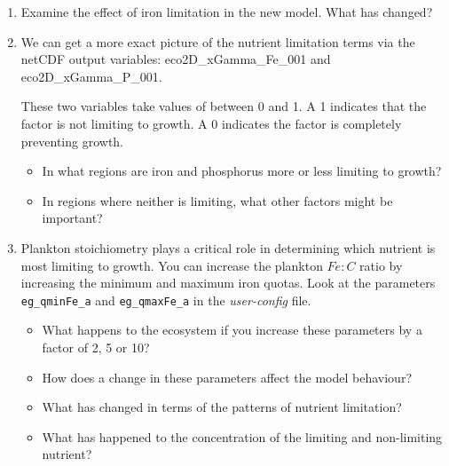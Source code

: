 \documentclass[11pt,fleqn]{book} %
\begin{document}
\begin{enumerate}[noitemsep]
\vspace{1mm}
\item Examine the effect of iron limitation in the new model. What has changed?

\vspace{1mm}
\item We can get a more exact picture of the nutrient limitation terms via the netCDF output variables: \textsf{\footnotesize eco2D\_xGamma\_Fe\_001} and \textsf{\footnotesize eco2D\_xGamma\_P\_001}.

These two variables take values of between 0 and 1. A \textsf{\footnotesize 1} indicates that the factor is not limiting to growth. A \textsf{\footnotesize 0} indicates the factor is completely preventing growth. 
\vspace{1mm}
\begin{itemize}
\item In what regions are iron and phosphorus more or less limiting to growth? \item In regions where neither is limiting, what other factors might be important?
\end{itemize}
\vspace{1mm}

\vspace{1mm}
\item  Plankton stoichiometry plays a critical role in determining which nutrient is most limiting to growth. You can increase the plankton \(Fe:C\) ratio by increasing the minimum and maximum iron quotas. Look at the parameters \texttt{eg\_qminFe\_a} and \texttt{eg\_qmaxFe\_a} in the \textit{user-config} file.

\pagebreak
\begin{itemize}
\item What happens to the ecosystem if you increase these parameters by a factor of 2, 5 or 10?
\item How does a change in these parameters affect the model behaviour?
\item What has changed in terms of the patterns of nutrient limitation?
\item What has happened to the concentration of the limiting and non-limiting nutrient?
\end{itemize}


\end{enumerate}
\end{document}
